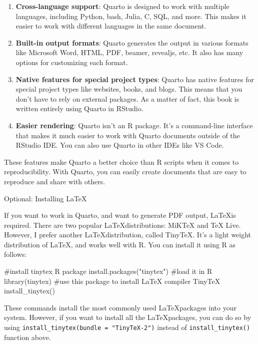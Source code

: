 \documentclass[
  letterpaper,
  paper =a4,
  twoside,
  openright,
  headsepline,
  footsepline,
  listof = totocnumbered,
  chapterprefix = true,
  firstiscover]{scrbook}
\newenvironment{Shaded}{\begin{snugshade}}{\end{snugshade}}
\newcommand{\CommentTok}[1]{\textcolor[rgb]{0.37,0.37,0.37}{#1}}
\newcommand{\FunctionTok}[1]{\textcolor[rgb]{0.28,0.35,0.67}{#1}}
\newcommand{\NormalTok}[1]{\textcolor[rgb]{0.00,0.23,0.31}{#1}}
\newcommand{\StringTok}[1]{\textcolor[rgb]{0.13,0.47,0.30}{#1}}
\begin{document}
\begin{enumerate}
\def\labelenumi{\arabic{enumi}.}
\item
  \textbf{Cross-language support}: Quarto is designed to work with
  multiple languages, including Python, bash, Julia, C, SQL, and more.
  This makes it easier to work with different languages in the same
  document.
\item
  \textbf{Built-in output formats}: Quarto generates the output in
  various formats like Microsoft Word, HTML, PDF, beamer, revealjs, etc.
  It also has many options for customizing each format.
\item
  \textbf{Native features for special project types}: Quarto has native
  features for special project types like websites, books, and blogs.
  This means that you don't have to rely on external packages. As a
  matter of fact, this book is written entirely using Quarto in RStudio.
\item
  \textbf{Easier rendering}: Quarto isn't an R package. It's a
  command-line interface that makes it much easier to work with Quarto
  documents outside of the RStudio IDE. You can also use Quarto in other
  IDEs like VS Code.
\end{enumerate}

These features make Quarto a better choice than R scripts when it comes
to reproducibility. With Quarto, you can easily create documents that
are easy to reproduce and share with others.

Optional: Installing \LaTeX

If you want to work in Quarto, and want to generate PDF output,
\LaTeX is required. There are two popular \LaTeX distributions: MiKTeX
and TeX Live. However, I prefer another \LaTeX distribution, called
TinyTeX. It's a light weight distribution of \LaTeX, and works well with
R. You can install it using R as follows:

\begin{Shaded}
\begin{Highlighting}[numbers=left,,]
\CommentTok{\#install tinytex R package}
\FunctionTok{install.packages}\NormalTok{(}\StringTok{"tinytex"}\NormalTok{)}
\CommentTok{\#load it in R}
\FunctionTok{library}\NormalTok{(tinytex)}
\CommentTok{\#use this package to install LaTeX compiler TinyTeX}
\FunctionTok{install\_tinytex}\NormalTok{()}
\end{Highlighting}
\end{Shaded}

These commands install the most commonly used \LaTeX packages into your
system. However, if you want to install all the \LaTeX packages, you can
do so by using \texttt{install\_tinytex(bundle\ =\ "TinyTeX-2")} instead
of \texttt{install\_tinytex()} function above.
\end{document}

